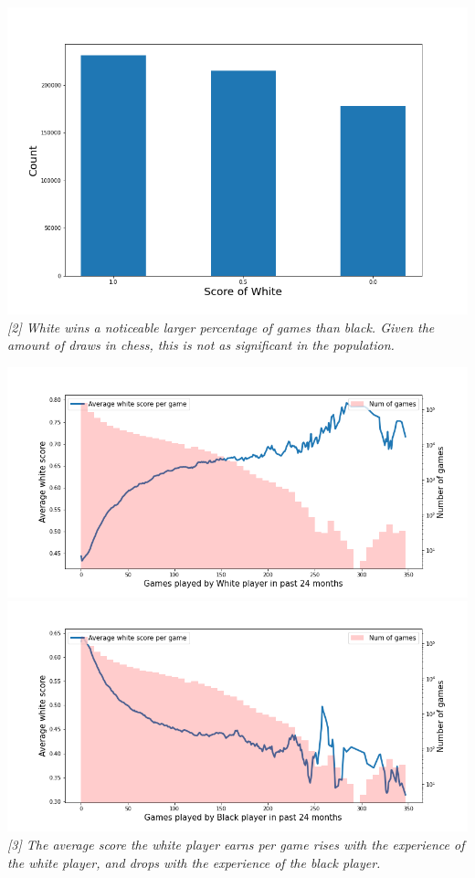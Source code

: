 \documentclass[12pt, letterpaper]{article}
\begin{document}
\begin{multicols}{2}
\setlength{\parskip}{0.0cm}
\begin{center}
\begin{small}
\includegraphics[width=\linewidth]{../figures/LiChessFigs/white_win.png}
\textit{[2] White wins a noticeable larger percentage of games than black. Given the amount of draws in chess, this is not as significant in the population.}
\end{small}
\end{center}

\setlength{\parskip}{0.0cm}
\begin{center}
\begin{small}
\includegraphics[width=\linewidth]{../figures/LiChessFigs/white_pre.png}
\includegraphics[width=\linewidth]{../figures/LiChessFigs/black_pre.png}
\textit{[3] The average score the white player earns per game rises with the experience of the white player, and drops with the experience of the black player.
}
\end{small}
\end{center}
\setlength{\parskip}{0.1cm}



\end{multicols}
\end{document}
